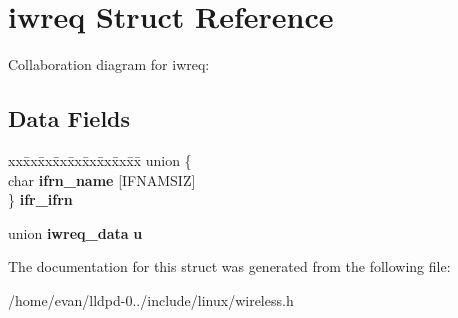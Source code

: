 \section{iwreq \-Struct \-Reference}
\label{structiwreq}


\-Collaboration diagram for iwreq\-:
\subsection*{\-Data \-Fields}
\begin{DoxyCompactItemize}
\item 
\begin{tabbing}
xx\=xx\=xx\=xx\=xx\=xx\=xx\=xx\=xx\=\kill
union \{\\
\>char {\bfseries ifrn\_name} [IFNAMSIZ]\\
\} {\bfseries ifr\_ifrn}\label{structiwreq_a031245f271b0737a3ef3dc37edcadb70}
\\

\end{tabbing}\item 
union {\bf iwreq\-\_\-data} {\bfseries u}\label{structiwreq_a102ade1cd28a774d4f80b0cf30b20b8a}

\end{DoxyCompactItemize}


\-The documentation for this struct was generated from the following file\-:\begin{DoxyCompactItemize}
\item 
/home/evan/lldpd-\/0../include/linux/wireless.\-h\end{DoxyCompactItemize}
